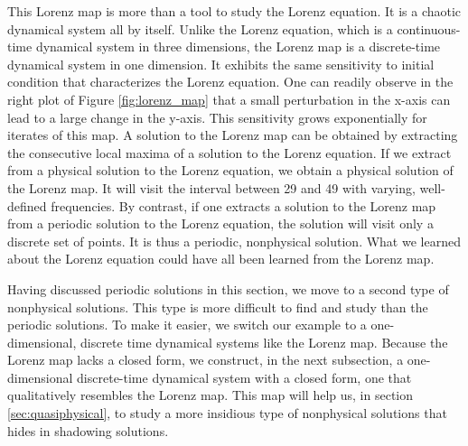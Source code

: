 This Lorenz map is more than a tool to study the Lorenz equation.  It is a chaotic
dynamical system all by itself. Unlike the Lorenz equation, which is a continuous-time
dynamical system in three dimensions, the Lorenz map is a discrete-time dynamical
system in one dimension.  It exhibits the same sensitivity to initial condition
that characterizes the Lorenz equation.  One can readily observe in the right
plot of Figure \ref{fig:lorenz_map} that a small perturbation in the x-axis
can lead to a large change in the y-axis. This sensitivity grows exponentially
for iterates of this map. A solution to the Lorenz map can be obtained
by extracting the consecutive local maxima of a solution to the Lorenz equation.
If we extract from a physical solution to the Lorenz equation, we obtain a physical solution of the Lorenz map.  It will visit the
interval between 29 and 49 with varying, well-defined frequencies.
By contrast, if one extracts a solution to the Lorenz map from a periodic solution
to the Lorenz equation, the solution will visit only a discrete set of points.
It is thus a periodic, nonphysical solution.  What we learned about
the Lorenz equation could have all been learned from the Lorenz map.

Having discussed periodic solutions in this section,
we move to a second type of nonphysical solutions.
This type is more difficult to find and study than the periodic solutions.
To make it easier, we switch our example to a one-dimensional, discrete time dynamical
systems like the Lorenz map.  Because the Lorenz map lacks a closed form,
we construct, in the next subsection, a one-dimensional discrete-time dynamical system
with a closed form, one that qualitatively resembles the Lorenz map.  This map
will help us, in section \ref{sec:quasiphysical}, to study a more insidious type
of nonphysical solutions that hides in shadowing solutions.

